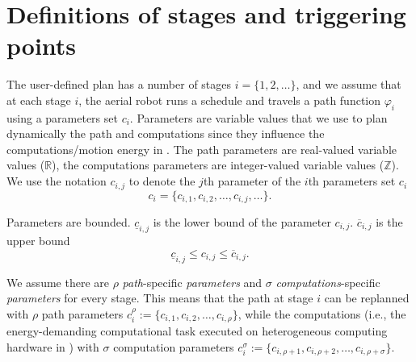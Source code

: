 \section{Definitions of stages and triggering points}
\label{sec:defs-stages-triggs}



The user-defined plan has a number of stages $i=\{1,2,\dots\}$, and we assume that at each stage $i$, the aerial robot runs a schedule and travels a path function $\varphi_i$ using a parameters set $c_i$.
Parameters are variable values that we use to plan dynamically the path and computations since they influence the computations/motion energy in . The path parameters are real-valued variable values ($\mathbb{R}$), the computations parameters are integer-valued variable values ($\mathbb{Z}$). We use the notation  $c_{i,j}$ to denote the $j$th parameter of the $i$th parameters set $c_i$
\begin{equation}
  c_i=\{c_{i,1},c_{i,2},\dots,c_{i,j},\dots\}.
\end{equation}

Parameters are bounded. $\underline{c}_{i,j}$ is the lower bound of the parameter $c_{i,j}$. $\overline{c}_{i,j}$ is the upper bound
\begin{equation}
  \underline{c}_{i,j}\leq c_{i,j}\leq\overline{c}_{i,j}.
\end{equation}

We assume there are $\rho$ \emph{path}-specific \emph{parameters} and $\sigma$ \emph{computations}-specific \emph{parameters} for every stage. This means that the path at stage $i$ can be replanned with $\rho$ path parameters
$c_i^\rho:=\{c_{i,1},c_{i,2},\dots,c_{i,\rho}\}$,
while the computations (i.e., the energy-demanding computational task executed on heterogeneous computing hardware in ) with $\sigma$ computation parameters 
$c_i^\sigma:=\{c_{i,\rho+1},c_{i,\rho+2},\dots,c_{i,\rho+\sigma}\}$.

